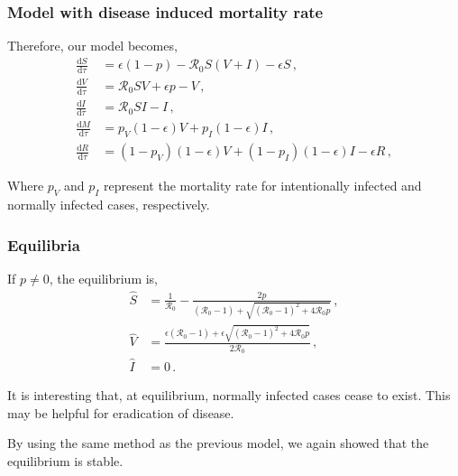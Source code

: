 \documentclass{beamer}
\newcommand\dbyd[2]{\frac{\mathrm d{#1}}{\mathrm d{#2}}}
\newcommand{\R}{\mathcal{R}}
\newcommand{\pmV}{p_{V}}
\newcommand{\pmI}{p_{I}}
\begin{document}
\begin{frame}
\frametitle{Model with disease induced mortality rate}

Therefore, our model becomes,
\begin{subequations}\label{eq:base_ODE}
\begin{align}
\dbyd{S}{\tau}&=\epsilon(1-p)- \R_0 S(V+I)-\epsilon S\,, \label{eq:S_by_tau}\\
\dbyd{V}{\tau}&=\R_0 SV+\epsilon p-V\,, \label{eq:V_by_tau}\\
\dbyd{I}{\tau}&=\R_0 SI-I\,, \label{eq:I_by_tau}\\
\dbyd{M}{\tau}&=\pmV(1-\epsilon) V+\pmI(1-\epsilon) I\,,\\
\dbyd{R}{\tau}&=(1-\pmV)(1-\epsilon) V+(1-\pmI)(1-\epsilon) I-\epsilon R\,,
\end{align}
\end{subequations}

Where $\pmV$ and $\pmI$ represent the mortality rate for intentionally infected and normally infected cases, respectively.
\end{frame}
\begin{frame}
\frametitle{Equilibria}

If $p\neq 0$, the equilibrium is,
\begin{subequations}
\begin{align}
\hat{S}&= \frac{1}{\R_0}-\frac{2p}{(\R_0 -1)+ \sqrt{(\R_0-1)^2+4\R_0
         p}}\,, \label{eq:Shat}\\
\hat{V}&= \frac{\epsilon(\R_0 -1)+ \epsilon \sqrt{(\R_0-1)^2+4\R_0 p}}{2\R_0}\,, \label{eq:Vhat}\\
\hat{I}&=0\,. \label{eq:Ihat}
\end{align}
\end{subequations}

It is interesting that, at equilibrium, normally infected cases cease to exist. This may be helpful for eradication of disease.
\end{frame}
\begin{frame}
By using the same method as the previous model, we again showed that the equilibrium is stable. 
\end{frame}
\end{document}
